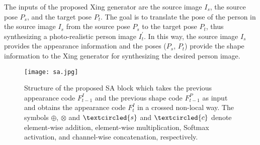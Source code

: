 \documentclass[runningheads]{llncs}
\begin{document}
The inputs of the proposed Xing generator are the source image $I_s$, the source pose $P_s$, and the target pose $P_t$.
The goal is to translate the pose of the person in the source image $I_s$ from the source pose $P_s$ to the target pose $P_t$, thus synthesizing a photo-realistic person image $I_t^{'}$.
In this way, the source image $I_s$ provides the appearance information and the poses ($P_s$, $P_t$) provide the shape information to the Xing generator for synthesizing the desired person image. 

\begin{figure}[t]
	\centering
	\texttt{[image: sa.jpg]}
	\caption{Structure of the proposed SA block which takes the previous appearance code $F_{t-1}^I$ and the previous shape code $F_{t-1}^P$ as input and obtains the appearance code $F_{t}^I$ in a crossed non-local way. The symbols $\oplus$, $\otimes$ and $\textcircled{s}$ and $\textcircled{c}$ denote element-wise addition, element-wise multiplication, Softmax activation, and channel-wise concatenation, respectively.}
	\label{fig:sa}
\end{figure}
\end{document}
